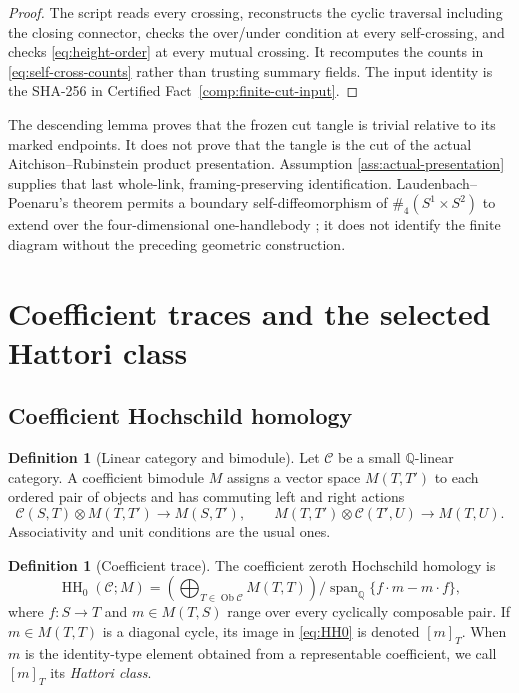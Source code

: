 \documentclass[10pt,reqno]{amsart}
\theoremstyle{definition}
\newtheorem{definition}[theorem]{Definition}
\theoremstyle{remark}
\newcommand{\Q}{\mathbb Q}
\newcommand{\HH}{\operatorname{HH}}
\newcommand{\Span}{\operatorname{span}}
\begin{document}
\begin{proof}
The script  reads every crossing,
reconstructs the cyclic traversal including the closing connector, checks the
over/under condition at every self-crossing, and checks
\cref{eq:height-order} at every mutual crossing.  It recomputes the counts in
\cref{eq:self-cross-counts} rather than trusting summary fields.  The input
identity is the SHA-256 in Certified Fact~\ref{comp:finite-cut-input}.
\end{proof}

The descending lemma proves that the frozen cut tangle is trivial relative to
its marked endpoints.  It does not prove that the tangle is the cut of the
actual Aitchison--Rubinstein product presentation.  Assumption
\ref{ass:actual-presentation} supplies that last whole-link, framing-preserving
identification.  Laudenbach--Poenaru's theorem permits a boundary
self-diffeomorphism of $\#_4(S^1\times S^2)$ to extend over the four-dimensional
one-handlebody \cite{LaudenbachPoenaru1972}; it does not identify the finite
diagram without the preceding geometric construction.

\section{Coefficient traces and the selected Hattori class}\label{sec:hattori}

\subsection{Coefficient Hochschild homology}

\begin{definition}[Linear category and bimodule]\label{def:category-bimodule}
Let $\mathcal C$ be a small $\Q$-linear category.  A coefficient bimodule
$M$ assigns a vector space $M(T,T')$ to each ordered pair of objects and has
commuting left and right actions
\begin{equation}\label{eq:bimodule-actions}
\mathcal C(S,T)\otimes M(T,T')\longrightarrow M(S,T'),
\qquad
M(T,T')\otimes\mathcal C(T',U)\longrightarrow M(T,U).
\end{equation}
Associativity and unit conditions are the usual ones.
\end{definition}

\begin{definition}[Coefficient trace]\label{def:coefficient-HH0}
The coefficient zeroth Hochschild homology is
\begin{equation}\label{eq:HH0}
\HH_0(\mathcal C;M)=
\left(\bigoplus_{T\in\operatorname{Ob}\mathcal C}M(T,T)\right)
\Big/
\Span_{\Q}\{f\cdot m-m\cdot f\},
\end{equation}
where $f:S\to T$ and $m\in M(T,S)$ range over every cyclically composable
pair.  If $m\in M(T,T)$ is a diagonal cycle, its image in
\cref{eq:HH0} is denoted $[m]_T$.  When $m$ is the identity-type element
obtained from a representable coefficient, we call $[m]_T$ its
\emph{Hattori class}.
\end{definition}
\end{document}

